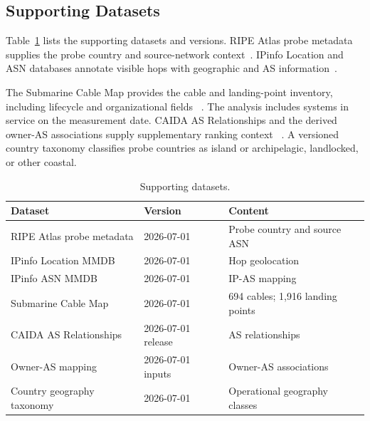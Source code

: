 \subsection{Supporting Datasets}
\label{subsec:supporting_data}

Table~\ref{tab:supporting_datasets} lists the supporting datasets and versions.
RIPE Atlas probe metadata supplies the probe country and source-network
context~\cite{ripe_atlas}. IPinfo Location and ASN databases annotate visible
hops with geographic and AS information~\cite{ipinfo}.

The Submarine Cable Map provides the cable and landing-point inventory,
including lifecycle and organizational fields
~\cite{telegeography_submarine_map}. The analysis includes systems in service
on the measurement date. CAIDA AS Relationships and the derived owner-AS
associations supply supplementary ranking context
~\cite{caida_as_relationships}. A versioned country taxonomy classifies probe
countries as island or archipelagic, landlocked, or other coastal.

\begin{table}[htb]
  \centering
  \caption{Supporting datasets.}
  \label{tab:supporting_datasets}
  \footnotesize
  \begin{tabular}{p{}p{}p{}}
    \toprule
    Dataset & Version & Content \\
    \midrule
    RIPE Atlas probe metadata & 2026-07-01 & Probe country and source ASN \\
    IPinfo Location MMDB & 2026-07-01 & Hop geolocation \\
    IPinfo ASN MMDB & 2026-07-01 & IP-AS mapping \\
    Submarine Cable Map & 2026-07-01 & 694 cables; 1,916 landing points \\
    CAIDA AS Relationships & 2026-07-01 release & AS relationships \\
    Owner-AS mapping & 2026-07-01 inputs & Owner-AS associations \\
    Country geography taxonomy & 2026-07-01 & Operational geography classes \\
    \bottomrule
  \end{tabular}
\end{table}
